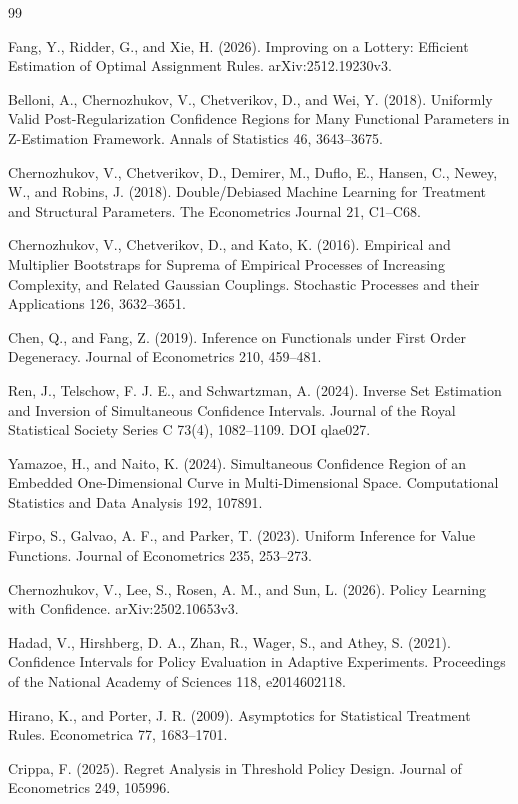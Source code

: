 \documentclass{article}
\begin{document}
\begin{thebibliography}{99}

   Fang, Y., Ridder, G., and Xie, H. (2026). Improving on a Lottery: Efficient Estimation of Optimal Assignment Rules. arXiv:2512.19230v3.

   Belloni, A., Chernozhukov, V., Chetverikov, D., and Wei, Y. (2018). Uniformly Valid Post-Regularization Confidence Regions for Many Functional Parameters in Z-Estimation Framework. Annals of Statistics 46, 3643--3675.

   Chernozhukov, V., Chetverikov, D., Demirer, M., Duflo, E., Hansen, C., Newey, W., and Robins, J. (2018). Double/Debiased Machine Learning for Treatment and Structural Parameters. The Econometrics Journal 21, C1--C68.

   Chernozhukov, V., Chetverikov, D., and Kato, K. (2016). Empirical and Multiplier Bootstraps for Suprema of Empirical Processes of Increasing Complexity, and Related Gaussian Couplings. Stochastic Processes and their Applications 126, 3632--3651.

   Chen, Q., and Fang, Z. (2019). Inference on Functionals under First Order Degeneracy. Journal of Econometrics 210, 459--481.

   Ren, J., Telschow, F. J. E., and Schwartzman, A. (2024). Inverse Set Estimation and Inversion of Simultaneous Confidence Intervals. Journal of the Royal Statistical Society Series C 73(4), 1082--1109. DOI qlae027.

   Yamazoe, H., and Naito, K. (2024). Simultaneous Confidence Region of an Embedded One-Dimensional Curve in Multi-Dimensional Space. Computational Statistics and Data Analysis 192, 107891.

   Firpo, S., Galvao, A. F., and Parker, T. (2023). Uniform Inference for Value Functions. Journal of Econometrics 235, 253--273.

   Chernozhukov, V., Lee, S., Rosen, A. M., and Sun, L. (2026). Policy Learning with Confidence. arXiv:2502.10653v3.

   Hadad, V., Hirshberg, D. A., Zhan, R., Wager, S., and Athey, S. (2021). Confidence Intervals for Policy Evaluation in Adaptive Experiments. Proceedings of the National Academy of Sciences 118, e2014602118.

   Hirano, K., and Porter, J. R. (2009). Asymptotics for Statistical Treatment Rules. Econometrica 77, 1683--1701.

   Crippa, F. (2025). Regret Analysis in Threshold Policy Design. Journal of Econometrics 249, 105996.

\end{thebibliography}
\end{document}
